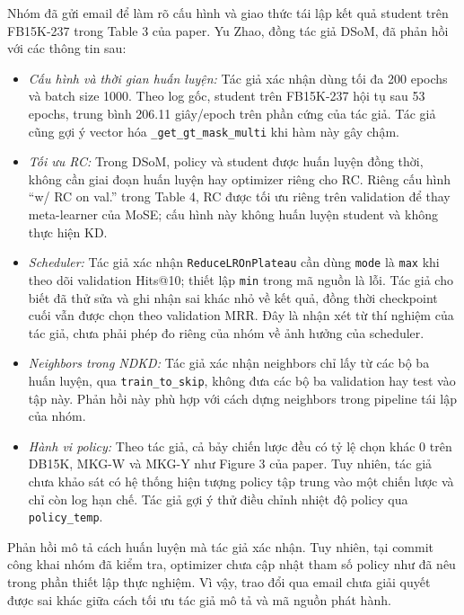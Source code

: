 Nhóm đã gửi email để làm rõ cấu hình và giao thức tái lập
kết quả student trên FB15K-237 trong Table 3 của paper.
Yu Zhao, đồng tác giả DSoM, đã phản hồi với các thông tin sau:
\begin{itemize}
    \item \textit{Cấu hình và thời gian huấn luyện:} Tác giả
    xác nhận dùng tối đa 200 epochs và batch size 1000.
    Theo log gốc, student trên FB15K-237 hội tụ sau 53 epochs,
    trung bình 206.11 giây/epoch trên phần cứng của tác giả.
    Tác giả cũng gợi ý vector hóa
    \texttt{\_get\_gt\_mask\_multi} khi hàm này gây chậm.

    \item \textit{Tối ưu RC:} Trong DSoM, policy và student
    được huấn luyện đồng thời, không cần giai đoạn huấn luyện
    hay optimizer riêng cho RC. Riêng cấu hình
    ``w/ RC on val.'' trong Table 4, RC được tối ưu riêng trên
    validation để thay meta-learner của MoSE; cấu hình này
    không huấn luyện student và không thực hiện KD.

    \item \textit{Scheduler:} Tác giả xác nhận
    \texttt{ReduceLROnPlateau} cần dùng \texttt{mode} là
    \texttt{max} khi theo dõi validation Hits@10; thiết lập
    \texttt{min} trong mã nguồn là lỗi. Tác giả cho biết đã
    thử sửa và ghi nhận sai khác nhỏ về kết quả, đồng thời
    checkpoint cuối vẫn được chọn theo validation MRR.
    Đây là nhận xét từ thí nghiệm của tác giả, chưa phải
    phép đo riêng của nhóm về ảnh hưởng của scheduler.

    \item \textit{Neighbors trong NDKD:} Tác giả xác nhận
    neighbors chỉ lấy từ các bộ ba huấn luyện, qua
    \texttt{train\_to\_skip}, không đưa các bộ ba validation
    hay test vào tập này. Phản hồi này phù hợp với cách
    dựng neighbors trong pipeline tái lập của nhóm.

    \item \textit{Hành vi policy:} Theo tác giả, cả bảy
    chiến lược đều có tỷ lệ chọn khác 0 trên DB15K, MKG-W và
    MKG-Y như Figure 3 của paper. Tuy nhiên, tác giả chưa
    khảo sát có hệ thống hiện tượng policy tập trung vào
    một chiến lược và chỉ còn log hạn chế. Tác giả gợi ý
    thử điều chỉnh nhiệt độ policy qua \texttt{policy\_temp}.
\end{itemize}

Phản hồi mô tả cách huấn luyện mà tác giả xác nhận. Tuy
nhiên, tại commit công khai nhóm đã kiểm tra, optimizer chưa
cập nhật tham số policy như đã nêu trong phần thiết lập
thực nghiệm. Vì vậy, trao đổi qua email chưa giải quyết được
sai khác giữa cách tối ưu tác giả mô tả và mã nguồn phát hành.

